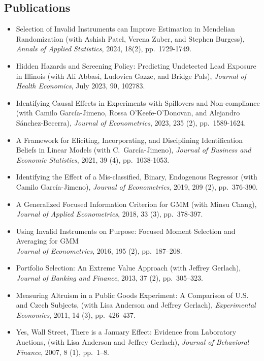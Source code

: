 \documentclass[line,overlapped]{myres}
\begin{document}
\begin{resume}
\section{\sc Publications}
\begin{itemize}
  \item Selection of Invalid Instruments can Improve Estimation in Mendelian Randomization (with Ashish Patel, Verena Zuber, and Stephen Burgess), \emph{Annals of Applied Statistics}, 2024, 18(2), pp.\ 1729-1749. 
  \item Hidden Hazards and Screening Policy: Predicting Undetected Lead Exposure in Illinois (with Ali Abbasi, Ludovica Gazze, and Bridge Pals), \emph{Journal of Health Economics}, July 2023, 90, 102783.
  \item Identifying Causal Effects in Experiments with Spillovers and Non-compliance (with Camilo Garc\'{i}a-Jimeno, Rossa O'Keefe-O'Donovan, and Alejandro S\'anchez-Becerra), \emph{Journal of Econometrics}, 2023, 235 (2), pp.\ 1589-1624.
    \item A Framework for Eliciting, Incorporating, and Disciplining Identification Beliefs in Linear Models (with C.\ Garc\'{i}a-Jimeno), \emph{Journal of Business and Economic Statistics}, 2021, 39 (4), pp.\ 1038-1053.
  \item Identifying the Effect of a Mis-classified, Binary, Endogenous Regressor (with Camilo Garc\'{i}a-Jimeno), \emph{Journal of Econometrics}, 2019, 209 (2), pp.\ 376-390.
  \item A Generalized Focused Information Criterion for GMM (with Minsu Chang), \emph{Journal of Applied Econometrics}, 2018, 33 (3), pp.\ 378-397.
  \item Using Invalid Instruments on Purpose: Focused Moment Selection and Averaging for GMM\\ \emph{Journal of Econometrics}, 2016, 195 (2), pp.\ 187--208.
	\item Portfolio Selection: An Extreme Value Approach (with Jeffrey Gerlach), \emph{Journal of Banking and Finance}, 2013, 37 (2), pp.\ 305--323.
	\item Measuring Altruism in a Public Goods Experiment:  A Comparison of U.S. and Czech Subjects, (with Lisa Anderson and Jeffrey Gerlach), \emph{Experimental Economics}, 2011, 14 (3), pp.\ 426--437.
	\item Yes, Wall Street, There is a January Effect: Evidence from Laboratory Auctions, (with Lisa Anderson and Jeffrey Gerlach), \emph{Journal of Behavioral Finance}, 2007, 8 (1), pp.\ 1--8. 
\end{itemize}



\end{resume}
\end{document}
